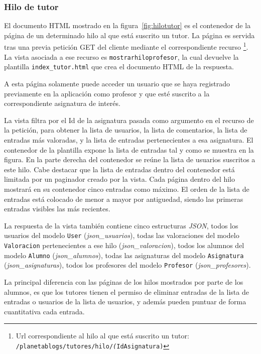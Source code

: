 \documentclass[a4paper, 12pt]{book}
\begin{document}
\subsubsection{Hilo de tutor} 
\label{sec:hilotutor}
El documento HTML mostrado en la figura~\ref{fig:hilotutor} es el contenedor de la p\'agina de un determinado hilo al que est\'a suscrito un tutor. 
La p\'agina es servida tras una previa petici\'on GET del cliente mediante el correspondiente recurso \footnote{Url correspondiente al hilo al que est\'a
suscrito un tutor: \texttt{/planetablogs/tutores/hilo/\textit(IdAsignatura)}}. La vista asociada a ese recurso es \texttt{mostrarhiloprofesor}, la cual 
devuelve la plantilla \texttt{index\_tutor.html} que crea el documento HTML de la respuesta.

A esta p\'agina solamente puede acceder un usuario que se haya registrado previamente en la aplicaci\'on como profesor y que est\'e suscrito a la
correspondiente asignatura de inter\'es.

La vista filtra por el Id de la asignatura pasada como argumento en el recurso de la petici\'on, para obtener la lista de 
usuarios, la lista de comentarios, la lista de entradas m\'as valoradas, y la lista de entradas pertenecientes a esa asignatura. 
El contenedor de la plantilla expone la lista de entradas tal y como se muestra en la figura. En la parte derecha del contenedor se re\'une la lista de 
usuarios suscritos a este hilo. Cabe destacar que la lista de entradas dentro del contenedor est\'a limitada por un paginador creado por la vista. Cada 
p\'agina dentro del hilo mostrar\'a en su contenedor cinco entradas como m\'aximo. El orden de la lista de entradas est\'a colocado de menor a mayor por 
antiguedad, siendo las primeras entradas visibles las m\'as recientes.

La respuesta de la vista tambi\'en contiene cinco estructuras \textit{JSON}, todos los usuarios del modelo \texttt{User} (\textit{json\_usuarios}), 
todas las valoraciones del modelo \texttt{Valoracion} pertenecientes a ese hilo (\textit{json\_valoracion}), todos los alumnos del modelo \texttt{Alumno} 
(\textit{json\_alumnos}), todas las asignaturas del modelo \texttt{Asignatura} (\textit{json\_asignaturas}), todos los profesores del modelo \texttt{Profesor} 
(\textit{json\_profesores}).

La principal diferencia con las p\'aginas de los hilos mostrados por parte de los alumnos, es que los tutores tienen el permiso de eliminar entradas de la 
lista de entradas o usuarios de la lista de usuarios, y adem\'as pueden puntuar de forma cuantitativa cada entrada.
\end{document}
